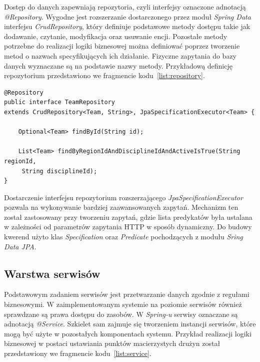 Dostęp do danych zapewniają repozytoria, czyli interfejsy oznaczone adnotacją \textit{@Repository}. Wygodne jest rozszerzanie dostarczonego przez moduł \textit{Spring Data} interfejsu \textit{CrudRepository}, który definiuje podstawowe metody dostępu takie jak dodawanie, czytanie, modyfikacja oraz usuwanie encji. Pozostałe metody potrzebne do realizacji logiki biznesowej można definiować poprzez tworzenie metod o nazwach specyfikujących ich działanie. Fizyczne zapytania do bazy danych wyznaczane są na podstawie nazwy metody. Przykładową definicję repozytorium przedstawiono we fragmencie kodu~\ref{list:repository}.

\begin{lstlisting}[label=list:repository, caption=Definicja repozytorium TeamRepository, basicstyle=\footnotesize\ttfamily]
@Repository
public interface TeamRepository 
extends CrudRepository<Team, String>, JpaSpecificationExecutor<Team> {

    Optional<Team> findById(String id);

    List<Team> findByRegionIdAndDisciplineIdAndActiveIsTrue(String regionId,
     String disciplineId);
}
\end{lstlisting}

Dostarczenie interfejsu repozytorium rozszerzającego \textit{JpaSpecificationExecutor} pozwala na wykonywanie bardziej zaawansowanych zapytań. Mechanizm ten został zastosowany przy tworzeniu zapytań, gdzie lista predykatów była ustalana w zależności od parametrów zapytania HTTP w sposób dynamiczny. Do budowy kwerend użyto klas \textit{Specification} oraz \textit{Predicate} pochodzących z modułu \textit{Sring Data JPA}.


\subsection{Warstwa serwisów}

Podstawowym zadaniem serwisów jest przetwarzanie danych zgodnie z regułami biznesowymi. W zaimplementowanym systemie na poziomie serwisów również sprawdzane są prawa dostępu do zasobów. W \textit{Spring-u} serwisy oznaczane są adnotacją \textit{@Service}. Szkielet sam zajmuje się tworzeniem instancji serwisów, które mogą być użyte w pozostałych komponentach systemu. Przykład realizacji logiki biznesowej w postaci ustawiania punktów macierzystych drużyn został przedstawiony we fragmencie kodu~\ref{list:service}.

